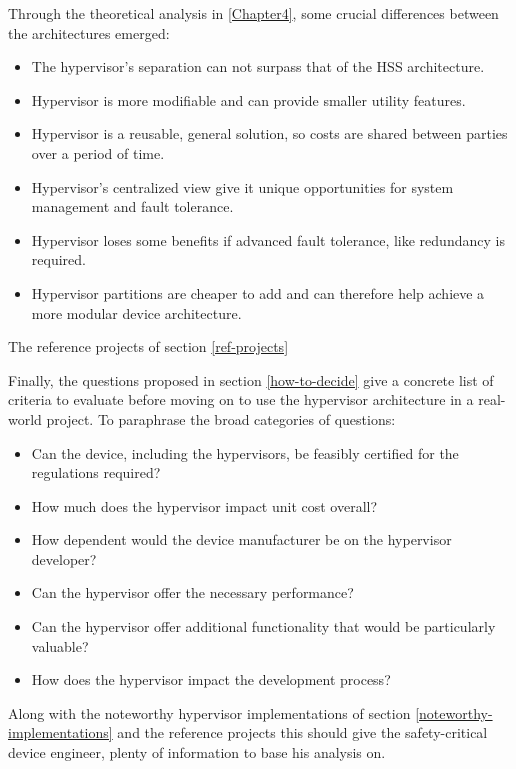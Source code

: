 Through the theoretical analysis in \ref{Chapter4}, some crucial differences between the architectures emerged:
\begin{itemize}
    \item The hypervisor's separation can not surpass that of the \gls{HSS} architecture.
    \item Hypervisor is more modifiable and can provide smaller utility features.
    \item Hypervisor is a reusable, general solution, so costs are shared between parties over a period of time.
    \item Hypervisor's centralized view give it unique opportunities for system management and fault tolerance.
    \item Hypervisor loses some benefits if advanced fault tolerance, like redundancy is required.
    \item Hypervisor partitions are cheaper to add and can therefore help achieve a more modular device architecture.
\end{itemize}

The reference projects of section \ref{ref-projects} 

Finally, the questions proposed in section \ref{how-to-decide} give a concrete list of criteria to evaluate before moving on to use the hypervisor architecture in a real-world project. To paraphrase the broad categories of questions:
\begin{itemize}
    \item Can the device, including the hypervisors, be feasibly certified for the regulations required?
    \item How much does the hypervisor impact unit cost overall?
    \item How dependent would the device manufacturer be on the hypervisor developer?
    \item Can the hypervisor offer the necessary performance?
    \item Can the hypervisor offer additional functionality that would be particularly valuable?
    \item How does the hypervisor impact the development process?
\end{itemize}
Along with the noteworthy hypervisor implementations of section \ref{noteworthy-implementations} and the reference projects this should give the safety-critical device engineer, plenty of information to base his analysis on. 

